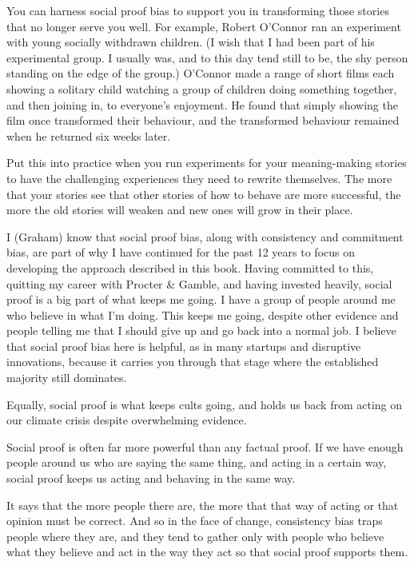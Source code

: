 You can harness social proof bias to support you in transforming those stories that no longer serve you well. For example, Robert O'Connor  ran an experiment with young socially withdrawn children. (I wish that I had been part of his experimental group. I usually was, and to this day tend still to be, the shy person standing on the edge of the group.) O'Connor made a range of short films each showing a solitary child watching a group of children doing something together, and then joining in, to everyone's enjoyment. He found that simply showing the film once transformed their behaviour, and the transformed behaviour remained when he returned six weeks later.


Put this into practice when you run experiments for your meaning\hyp{}making stories to have the challenging experiences they need to rewrite themselves. The more that your stories see that other stories of how to behave are more successful, the more the old stories will weaken and new ones will grow in their place.


\begin{longstoryblock}
I (Graham) know that social proof bias, along with consistency and commitment bias, are part of why I have continued for the past 12 years to focus on developing the approach described in this book. Having committed to this, quitting my career with Procter \& Gamble,  and having invested heavily, social proof is a big part of what keeps me going. I have a group of people around me who believe in what I'm doing. This keeps me going, despite other evidence and people telling me that I should give up and go back into a normal job. I believe that social proof bias here is helpful, as in many startups and disruptive innovations, because it carries you through that stage where the established majority still dominates.
\end{longstoryblock}


Equally, social proof is what keeps cults going, and holds us back from acting on our climate crisis despite overwhelming evidence. 


Social proof is often far more powerful than any factual proof. If we have enough people around us who are saying the same thing, and acting in a certain way, social proof keeps us acting and behaving in the same way. 


It says that the more people there are, the more that that way of acting or that opinion must be correct. And so in the face of change, consistency bias traps people where they are, and they tend to gather only with people who believe what they believe and act in the way they act so that social proof supports them.


